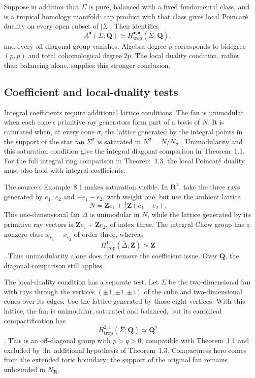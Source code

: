 Suppose in addition that $\Sigma$ is pure, balanced with a fixed
fundamental class, and is a tropical homology manifold: cap product
with that class gives local Poincar\'e duality on every open subset of
$|\Sigma|$. Then \cite[Theorem~1.3]{AP24FanChow} identifies
\[
 A^\bullet(\Sigma;\mathbf Q)
   \simeq H^{\bullet,\bullet}_{\mathrm{trop}}
                   (\overline\Sigma;\mathbf Q),
\]
and every off-diagonal group vanishes. Algebra degree $p$ corresponds
to bidegree $(p,p)$ and total cohomological degree $2p$. The local
duality condition, rather than balancing alone, supplies this stronger
conclusion.

\subsection{Coefficient and local-duality tests}

Integral coefficients require additional lattice conditions. The fan is
unimodular when each cone's primitive ray generators form part of a
basis of $N$. It is saturated when, at every cone $\sigma$, the lattice
generated by the integral points in the support of the star fan
$\Sigma^\sigma$ is saturated in $N^\sigma=N/N_\sigma$
\cite[\S2.1]{AP24FanChow}. Unimodularity and this saturation condition
give the integral diagonal comparison in Theorem~1.1. For the full
integral ring comparison in Theorem~1.3, the local Poincar\'e duality
must also hold with integral coefficients.

The source's Example~8.1 makes saturation visible. In $\mathbf R^2$,
take the three rays generated by $e_1$, $e_2$ and $-e_1-e_2$, with
weight one, but use the ambient lattice
\[
 N=\mathbf Z e_1+\tfrac13\mathbf Z(e_1-e_2).
\]
This one-dimensional fan $\Delta$ is unimodular in $N$, while the
lattice generated by its primitive ray vectors is
$\mathbf Z e_1+\mathbf Z e_2$, of index three. The integral Chow group
has a nonzero class $x_{\rho_1}-x_{\rho_2}$ of order three, whereas
\[
 H^{1,1}_{\mathrm{trop}}(\overline\Delta;\mathbf Z)
       \simeq\mathbf Z
\]
\cite[Example~8.1]{AP24FanChow}. Thus unimodularity alone does not
remove the coefficient issue. Over $\mathbf Q$, the diagonal
comparison still applies.

The local-duality condition has a separate test. Let $\Sigma$ be the
two-dimensional fan with rays through the vertices $(\pm1,\pm1,\pm1)$
of the cube and two-dimensional cones over its edges. Use the lattice
generated by those eight vertices. With this lattice, the fan is
unimodular, saturated and balanced, but its canonical compactification
has
\[
 H^{2,1}_{\mathrm{trop}}(\overline\Sigma;\mathbf Q)
      \simeq\mathbf Q^2
\]
\cite[Example~8.3 and Table~1]{AP24FanChow}. This is an off-diagonal
group with $p>q>0$, compatible with Theorem~1.1 and excluded by the
additional hypothesis of Theorem~1.3. Compactness here comes from
the extended toric boundary; the support of the original fan remains
unbounded in $N_{\mathbf R}$.

